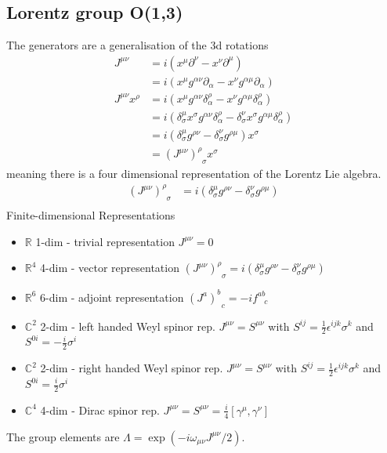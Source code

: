 \documentclass[10pt,a4paper]{book}
\theoremstyle{definition}
\begin{document}
\subsection{Lorentz group O(1,3)}
The generators are a generalisation of the 3d rotations
\begin{align}
J^{\mu\nu}
&=i(x^\mu\partial^\nu-x^\nu\partial^\mu)\\
&=i(x^\mu g^{\alpha\nu}\partial_\alpha-x^\nu g^{\alpha\mu}\partial_\alpha)\\
J^{\mu\nu}x^\rho
&=i(x^\mu g^{\alpha\nu}\delta^\rho_\alpha-x^\nu g^{\alpha\mu}\delta^\rho_\alpha)\\
&=i(\delta^\mu_\sigma x^\sigma g^{\alpha\nu}\delta^\rho_\alpha-\delta^\nu_\sigma x^\sigma g^{\alpha\mu}\delta^\rho_\alpha)\\
&=i(\delta^\mu_\sigma g^{\rho\nu}-\delta^\nu_\sigma g^{\rho\mu})x^\sigma\\
&=(J^{\mu\nu})^\rho_{\;\;\sigma}x^\sigma
\end{align}
meaning there is a four dimensional representation of the Lorentz Lie algebra. 
\begin{align}
(J^{\mu\nu})^\rho_{\;\;\sigma}&=i(\delta^\mu_\sigma g^{\rho\nu}-\delta^\nu_\sigma g^{\rho\mu})\\
\end{align}
Finite-dimensional Representations
\begin{itemize}
\item $\mathbb{R}$ 1-dim - trivial representation $J^{\mu\nu}=0$
\item $\mathbb{R}^4$ 4-dim - vector representation $(J^{\mu\nu})^\rho_{\;\;\sigma}=i(\delta^\mu_\sigma g^{\rho\nu}-\delta^\nu_\sigma g^{\rho\mu})$
\item $\mathbb{R}^6$ 6-dim - adjoint representation $(J^a)^b_{\;\;c}=-if^{ab}_{\;\;\;c}$
\item $\mathbb{C}^2$ 2-dim - left handed Weyl spinor rep. $J^{\mu\nu}=S^{\mu\nu}$ with $S^{ij}=\frac{1}{2}\epsilon^{ijk}\sigma^k$ and $S^{0i}=-\frac{i}{2}\sigma^i$
\item $\mathbb{C}^2$ 2-dim - right handed Weyl spinor rep. $J^{\mu\nu}=S^{\mu\nu}$ with $S^{ij}=\frac{1}{2}\epsilon^{ijk}\sigma^k$ and $S^{0i}=\frac{i}{2}\sigma^i$
\item $\mathbb{C}^4$ 4-dim - Dirac spinor rep. $J^{\mu\nu}=S^{\mu\nu}=\frac{i}{4}[\gamma^\mu,\gamma^\nu]$ 
\end{itemize}
The group elements are $\Lambda=\exp\left(-i\omega_{\mu\nu}J^{\mu\nu}/2\right)$.
\end{document}

